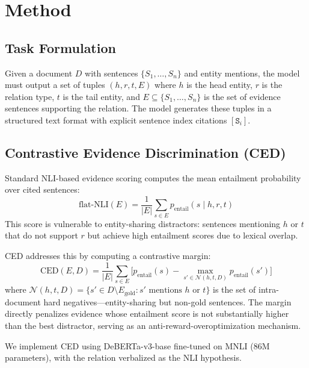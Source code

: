 \documentclass[11pt,a4paper]{article}
\newcommand{\ced}{CED}
\begin{document}
\section{Method}
\label{sec:method}

\subsection{Task Formulation}

Given a document $D$ with sentences $\{S_1, \ldots, S_n\}$ and entity mentions, the model must output a set of tuples $(h, r, t, E)$ where $h$ is the head entity, $r$ is the relation type, $t$ is the tail entity, and $E \subseteq \{S_1, \ldots, S_n\}$ is the set of evidence sentences supporting the relation.
The model generates these tuples in a structured text format with explicit sentence index citations $[\texttt{S}_i]$.

\subsection{Contrastive Evidence Discrimination (\ced{})}

Standard NLI-based evidence scoring computes the mean entailment probability over cited sentences:
\begin{equation}
\text{flat-NLI}(E) = \frac{1}{|E|}\sum_{s \in E} p_{\text{entail}}(s \mid h, r, t)
\end{equation}
This score is vulnerable to entity-sharing distractors: sentences mentioning $h$ or $t$ that do not support $r$ but achieve high entailment scores due to lexical overlap.

\ced{} addresses this by computing a contrastive margin:
\begin{equation}
\text{\ced{}}(E, D) = \frac{1}{|E|}\sum_{s \in E} \Big[ p_{\text{entail}}(s) - \max_{s' \in \mathcal{N}(h,t,D)} p_{\text{entail}}(s') \Big]
\end{equation}
where $\mathcal{N}(h,t,D) = \{s' \in D \setminus E_{\text{gold}} : s' \text{ mentions } h \text{ or } t\}$ is the set of intra-document hard negatives---entity-sharing but non-gold sentences.
The margin directly penalizes evidence whose entailment score is not substantially higher than the best distractor, serving as an anti-reward-overoptimization mechanism.

We implement \ced{} using DeBERTa-v3-base fine-tuned on MNLI (86M parameters), with the relation verbalized as the NLI hypothesis.
\end{document}
